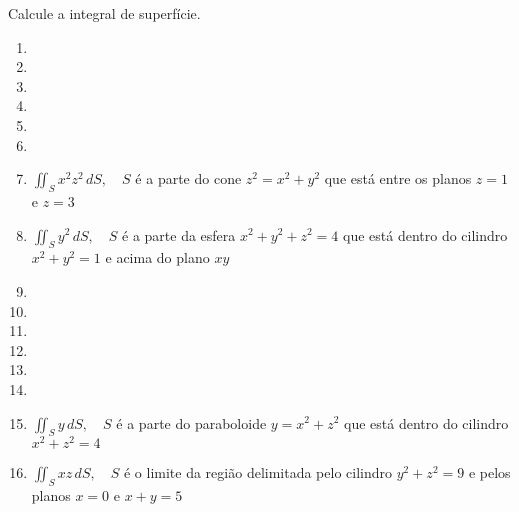 



	
	
	\vspace{5mm}
	
	Calcule a integral de superfície.
	
	\begin{enumerate}
		
		\item
		\resposta{}

		\item
		\resposta{}

		\item
		\resposta{}

		\item
		\resposta{}

		\item
		\resposta{}

		\item
		\resposta{}

		\item $\displaystyle \iint_S x^{2}z^{2} \, dS, \quad S$ é a parte do cone $z^2 = x^2 + y^2$ que está entre os planos $z = 1$ e $z = 3$\\
		\resposta{\fazer}

		\item $\displaystyle \iint_S y^{2} \, dS, \quad S$ é a parte da esfera $x^2 + y^2 + z^2 = 4$ que está dentro do cilindro $x^2 + y^2 = 1$ e acima do plano $xy$
		\resposta{\fazer}

		\item
		\resposta{}

		\item
		\resposta{}

		\item
		\resposta{}

		\item
		\resposta{}

		\item
		\resposta{}

		\item
		\resposta{}

		\item $\displaystyle \iint_S y \, dS, \quad S$ é a parte do paraboloide $y = x^2 + z^2$ que está dentro do cilindro $x^2 + z^2 = 4$
		\resposta{\fazer}

		\item $\displaystyle \iint_S xz \, dS, \quad S$ é o limite da região delimitada pelo cilindro $y^2 + z^2 = 9$ e pelos planos $x = 0$ e $x + y = 5$
		\resposta{\fazer}
	
	\end{enumerate}
	
